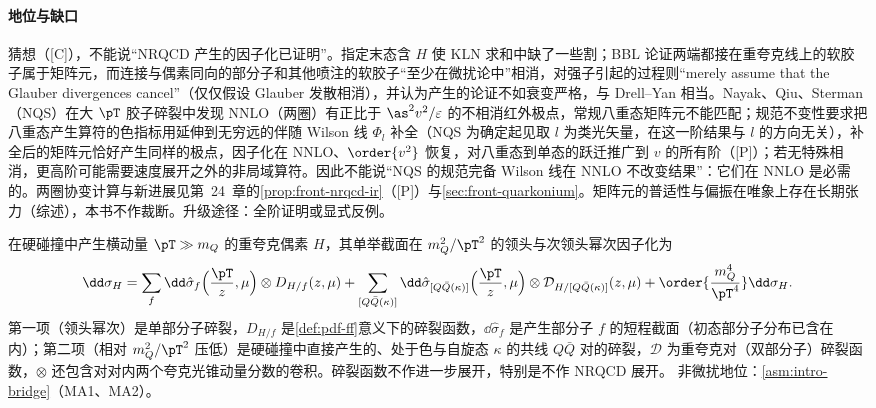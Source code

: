 \paragraph{地位与缺口}
猜想（[C]），不能说“NRQCD 产生的因子化已证明”。指定末态含 $H$ 使 KLN 求和中缺了一些割；BBL 论证两端都接在重夸克线上的软胶子属于矩阵元，而连接与偶素同向的部分子和其他喷注的软胶子“至少在微扰论中”相消，对强子引起的过程则“merely assume that the Glauber divergences cancel”（仅仅假设 Glauber 发散相消），并认为产生的论证不如衰变严格，与 Drell--Yan 相当\cite[第~VI.A~节]{BodwinBraatenLepage1995}。Nayak、Qiu、Sterman（NQS）在大 $\pT$ 胶子碎裂中发现 NNLO（两圈）有正比于 $\as^2v^2/\varepsilon$ 的不相消红外极点，常规八重态矩阵元不能匹配；规范不变性要求把八重态产生算符的色指标用延伸到无穷远的伴随 Wilson 线 $\Phi_l$ 补全（NQS 为确定起见取 $l$ 为类光矢量，在这一阶结果与 $l$ 的方向无关），补全后的矩阵元恰好产生同样的极点，因子化在 NNLO、$\order{v^2}$ 恢复\cite{NayakQiuSterman2005a,NayakQiuSterman2005b}，对八重态到单态的跃迁推广到 $v$ 的所有阶\cite{NayakQiuSterman2006}（[P]）；若无特殊相消，更高阶可能需要速度展开之外的非局域算符\cite{NayakQiuSterman2005a}。因此不能说“NQS 的规范完备 Wilson 线在 NNLO 不改变结果”：它们在 NNLO 是必需的。两圈协变计算与新进展见第~24~章的\cref{prop:front-nrqcd-ir}（[P]）与\cref{sec:front-quarkonium}。矩阵元的普适性与偏振在唯象上存在长期张力\cite{Butenschoen:2010rq,Butenschoen:2011yh,Butenschoen:2012px,Chao:2012iv}（综述\cite{BrambillaEtAl2011,Lansberg:2019adr}），本书不作裁断。升级途径：全阶证明或显式反例。

\begin{proposition}\label{prop:heavy-quarkonium-fragmentation}
在硬碰撞中产生横动量 $\pT\gg m_Q$ 的重夸克偶素 $H$，其单举截面在 $m_Q^2/\pT^2$ 的领头与次领头幂次因子化为
\begin{equation}\label{eq:heavy-frag}
\dd\sigma_{H}=\sum_f\dd\hat\sigma_{f}\Big(\frac{\pT}{z},\mu\Big)\otimes D_{H/f}(z,\mu)
+\sum_{[Q\bar Q(\kappa)]}\dd\hat\sigma_{[Q\bar Q(\kappa)]}\Big(\frac{\pT}{z},\mu\Big)\otimes\mathcal D_{H/[Q\bar Q(\kappa)]}(z,\mu)
+\order{\frac{m_Q^4}{\pT^4}}\dd\sigma_H .
\end{equation}
第一项（领头幂次）是单部分子碎裂，$D_{H/f}$ 是\cref{def:pdf-ff}意义下的碎裂函数，$\dd\hat\sigma_f$ 是产生部分子 $f$ 的短程截面（初态部分子分布已含在内）；第二项（相对 $m_Q^2/\pT^2$ 压低）是硬碰撞中直接产生的、处于色与自旋态 $\kappa$ 的共线 $Q\bar Q$ 对的碎裂，$\mathcal D$ 为重夸克对（双部分子）碎裂函数，$\otimes$ 还包含对对内两个夸克光锥动量分数的卷积。碎裂函数不作进一步展开，特别是不作 NRQCD 展开。
非微扰地位：\cref{asm:intro-bridge}（MA1、MA2）。
\end{proposition}

